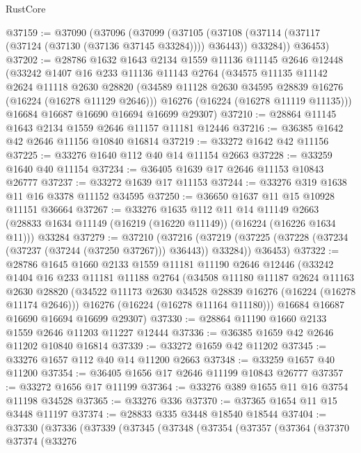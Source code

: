 \begin{lexlean}{RustCore}
\begin{coremodule}
@37159 := @37090
    (@37096
      (@37099
        (@37105 (@37108 (@37114 (@37117 (@37124 (@37130 (@37136 @37145 @33284)))) @36443)) @33284))
      @36453)
@37202 := @28786
    @1632
    @1643
    @2134
    @1559
    @11136
    @11145
    @2646
    @12448
    (@33242
      @1407
      @16
      @233
      @11136
      @11143
      @2764
      (@34575
        @11135
        @11142
        @2624
        @11118
        @2630
        @28820
        (@34589 @11128 @2630 @34595 @28839 @16276 (@16224 (@16278 @11129 @2646)))
        @16276
        (@16224 (@16278 @11119 @11135)))
      @16684
      @16687
      @16690
      @16694
      @16699
      @29307)
@37210 := @28864 @11145 @1643 @2134 @1559 @2646 @11157 @11181 @12446
@37216 := @36385 @1642 @42 @2646 @11156 @10840 @16814
@37219 := @33272 @1642 @42 @11156
@37225 := @33276 @1640 @112 @40 @14 @11154 @2663
@37228 := @33259 @1640 @40 @11154
@37234 := @36405 @1639 @17 @2646 @11153 @10843 @26777
@37237 := @33272 @1639 @17 @11153
@37244 := @33276 @319 @1638 @11 @16 @3378 @11152 @34595
@37250 := @36650 @1637 @11 @15 @10928 @11151 @36664
@37267 := @33276
    @1635
    @112
    @11
    @14
    @11149
    @2663
    (@28833 @1634 @11149 (@16219 (@16220 @11149)) (@16224 (@16226 @1634 @11)))
    @33284
@37279 := @37210
    (@37216
      (@37219 (@37225 (@37228 (@37234 (@37237 (@37244 (@37250 @37267))) @36443)) @33284))
      @36453)
@37322 := @28786
    @1645
    @1660
    @2133
    @1559
    @11181
    @11190
    @2646
    @12446
    (@33242
      @1404
      @16
      @233
      @11181
      @11188
      @2764
      (@34508
        @11180
        @11187
        @2624
        @11163
        @2630
        @28820
        (@34522 @11173 @2630 @34528 @28839 @16276 (@16224 (@16278 @11174 @2646)))
        @16276
        (@16224 (@16278 @11164 @11180)))
      @16684
      @16687
      @16690
      @16694
      @16699
      @29307)
@37330 := @28864 @11190 @1660 @2133 @1559 @2646 @11203 @11227 @12444
@37336 := @36385 @1659 @42 @2646 @11202 @10840 @16814
@37339 := @33272 @1659 @42 @11202
@37345 := @33276 @1657 @112 @40 @14 @11200 @2663
@37348 := @33259 @1657 @40 @11200
@37354 := @36405 @1656 @17 @2646 @11199 @10843 @26777
@37357 := @33272 @1656 @17 @11199
@37364 := @33276 @389 @1655 @11 @16 @3754 @11198 @34528
@37365 := @33276 @336
@37370 := @37365 @1654 @11 @15 @3448 @11197
@37374 := @28833 @335 @3448 @18540 @18544
@37404 := @37330
    (@37336
      (@37339
        (@37345
          (@37348
            (@37354
              (@37357
                (@37364
                  (@37370
                    @37374
                    (@33276

\end{coremodule}
\end{lexlean}
